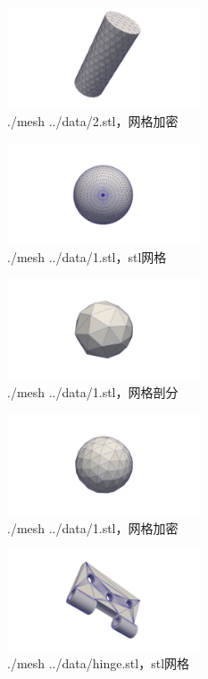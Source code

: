 \begin{figure}[!htbp]
  \centering
  \includegraphics[height=3cm]{fig/1/1.1.4/3.png}
  \caption{./mesh ../data/2.stl，网格加密}
  \label{fig:1-7}
\end{figure}

\begin{figure}[!htbp]
  \centering
  \includegraphics[height=3cm]{fig/1/1.1.4/4.png}
  \caption{./mesh ../data/1.stl，stl网格}
  \label{fig:1-7}
\end{figure}

\begin{figure}[!htbp]
  \centering
  \includegraphics[height=3cm]{fig/1/1.1.4/5.png}
  \caption{./mesh ../data/1.stl，网格剖分}
  \label{fig:1-7}
\end{figure}

\begin{figure}[!htbp]
  \centering
  \includegraphics[height=3cm]{fig/1/1.1.4/6.png}
  \caption{./mesh ../data/1.stl，网格加密}
  \label{fig:1-7}
\end{figure}

\begin{figure}[!htbp]
  \centering
  \includegraphics[height=3cm]{fig/1/1.1.4/7.png}
  \caption{./mesh ../data/hinge.stl，stl网格}
  \label{fig:1-7}
\end{figure}

